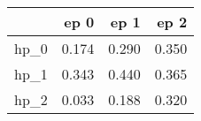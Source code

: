 \begin{tabular}{lrrr}
\toprule
{} &   ep 0 &   ep 1 &   ep 2 \\
\midrule
hp\_0 &  0.174 &  0.290 &  0.350 \\
hp\_1 &  0.343 &  0.440 &  0.365 \\
hp\_2 &  0.033 &  0.188 &  0.320 \\
\bottomrule
\end{tabular}
